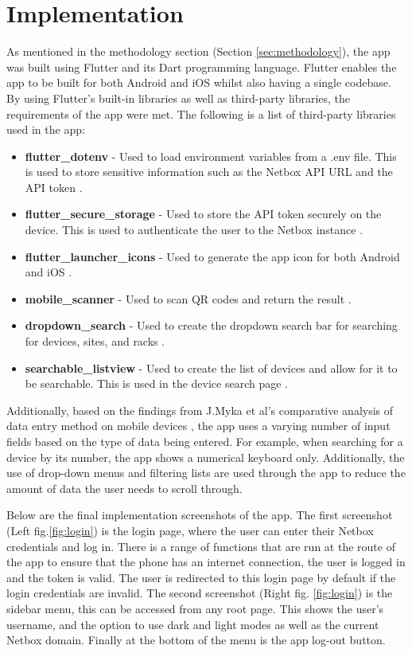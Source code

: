 \documentclass [11pt,a4paper]{article}
\begin{document}
\section{Implementation}
\label{sec:implementation}
As mentioned in the methodology section (Section \ref{sec:methodology}), the app was built using Flutter and its Dart programming language. Flutter enables the app to be built for both Android and iOS whilst also having a single codebase. By using Flutter's built-in libraries as well as third-party libraries, the requirements of the app were met. The following is a list of third-party libraries used in the app:
\begin{itemize}
    \item \textbf{flutter\_dotenv} - Used to load environment variables from a .env file. This is used to store sensitive information such as the Netbox API URL and the API token \cite{dot_env}.
    \item \textbf{flutter\_secure\_storage} - Used to store the API token securely on the device. This is used to authenticate the user to the Netbox instance \cite{secure_sec}.
    \item \textbf{flutter\_launcher\_icons} - Used to generate the app icon for both Android and iOS \cite{icon_launch}.
    \item \textbf{mobile\_scanner} - Used to scan QR codes and return the result \cite{barcodeScannerPlugin}.
    \item \textbf{dropdown\_search} - Used to create the dropdown search bar for searching for devices, sites, and racks \cite{dropdown}.
    \item \textbf{searchable\_listview} - Used to create the list of devices and allow for it to be searchable. This is used in the device search page \cite{searchable}. 
\end{itemize}

Additionally, based on the findings from J.Myka et al's comparative analysis of data entry method on mobile devices \cite{myka2019comparative}, the app uses a varying number of input fields based on the type of data being entered. For example, when searching for a device by its number, the app shows a numerical keyboard only. Additionally, the use of drop-down menus and filtering lists are used through the app to reduce the amount of data the user needs to scroll through.

Below are the final implementation screenshots of the app. The first screenshot (Left fig.\ref{fig:login}) is the login page, where the user can enter their Netbox credentials and log in. There is a range of functions that are run at the route of the app to ensure that the phone has an internet connection, the user is logged in and the token is valid. The user is redirected to this login page by default if the login credentials are invalid. The second screenshot (Right fig. \ref{fig:login}) is the sidebar menu, this can be accessed from any root page. This shows the user's username, and the option to use dark and light modes as well as the current Netbox domain. Finally at the bottom of the menu is the app log-out button.
\end{document}
